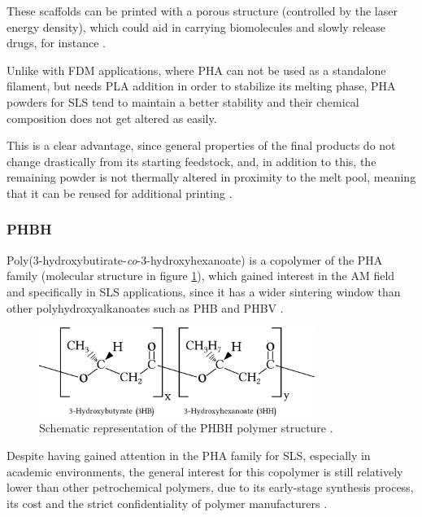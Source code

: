 \documentclass{article}
\begin{document}
    These scaffolds can be printed with a porous structure (controlled by the laser energy density), 
    which could aid in carrying biomolecules and slowly release drugs, for instance \autocites{Messori_Bondioli_PHAs}.
    
    Unlike with FDM applications, where PHA can not be used as a standalone filament, but needs PLA addition in order to stabilize its melting 
    phase, PHA powders for SLS tend to maintain a better stability and their chemical composition does not get altered as easily. 

    This is a clear advantage, since general properties of the final products do not change drastically from its starting feedstock, 
    and, in addition to this, the remaining powder is not thermally altered in proximity to the melt pool, meaning that it can 
    be reused for additional printing \autocite{Kovalcik_PHA_Review}.  \\
        
    \subsubsection{PHBH \label{PHBH}}

    Poly(3-hydroxybutirate-\textit{co}-3-hydroxyhexanoate) is a copolymer of the PHA family (molecular structure in figure \ref{fig:PHBH_structure}), which gained 
    interest in the AM field and specifically in SLS applications, since it has a wider sintering window than other polyhydroxyalkanoates
    such as PHB and PHBV \autocites{DechetMaximilianA2020OtDo}{doi:10.1063/1.4918516}. \\ 

    \begin{figure}[h!]
        \centering
        \includegraphics[width=0.8\textwidth]{Pictures/PHBH_chain.eps}
        \caption{Schematic representation of the PHBH polymer structure \autocites{PHBH,Inkscape}.}
        \label{fig:PHBH_structure}
    \end{figure}
    
    Despite having gained attention in the PHA family for SLS, especially in academic environments, the general interest for this copolymer
    is still relatively lower than other 
    petrochemical polymers, due to its early-stage synthesis process, its cost and the strict confidentiality 
    of polymer manufacturers \autocite{Eraslan_PHBH_review}.  
\end{document}
